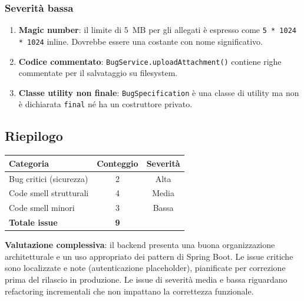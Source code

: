 \subsubsection{Severità bassa}

\begin{enumerate}
    \item \textbf{Magic number}: il limite di 5~MB per gli allegati è espresso
    come \texttt{5 * 1024 * 1024} inline. Dovrebbe essere una costante con nome
    significativo.

    \item \textbf{Codice commentato}: \texttt{BugService.uploadAttachment()}
    contiene righe commentate per il salvataggio su filesystem.

    \item \textbf{Classe utility non finale}: \texttt{BugSpecification} è una
    classe di utility ma non è dichiarata \texttt{final} né ha un costruttore
    privato.
\end{enumerate}

\subsection{Riepilogo}

\begin{center}
\begin{tabular}{|l|c|c|}
\hline
\textbf{Categoria} & \textbf{Conteggio} & \textbf{Severità} \\
\hline
Bug critici (sicurezza) & 2 & Alta \\
\hline
Code smell strutturali & 4 & Media \\
\hline
Code smell minori & 3 & Bassa \\
\hline
\textbf{Totale issue} & \textbf{9} & \\
\hline
\end{tabular}
\end{center}

\textbf{Valutazione complessiva}: il backend presenta una buona organizzazione
architetturale e un uso appropriato dei pattern di Spring Boot. Le issue
critiche sono localizzate e note (autenticazione placeholder), pianificate per
correzione prima del rilascio in produzione. Le issue di severità media e bassa
riguardano refactoring incrementali che non impattano la correttezza funzionale.
